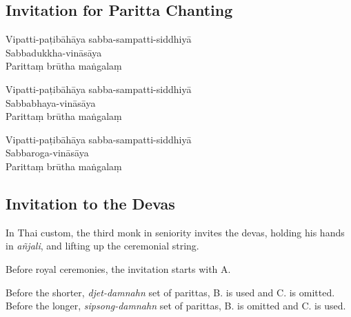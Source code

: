 \subsection{Invitation for Paritta Chanting}
\label{paritta-invitation-for-chanting}


\vspace*{5pt}

\begin{paritta}


Vipatti-paṭibāhāya sabba-sampatti-siddhiyā\\
Sabbadukkha-vināsāya\\
Parittaṃ brūtha maṅgalaṃ

Vipatti-paṭibāhāya sabba-sampatti-siddhiyā\\
Sabbabhaya-vināsāya\\
Parittaṃ brūtha maṅgalaṃ

Vipatti-paṭibāhāya sabba-sampatti-siddhiyā\\
Sabbaroga-vināsāya\\
Parittaṃ brūtha maṅgalaṃ

\end{paritta}


\subsection{Invitation to the Devas}
\label{paritta-devas}


\enlargethispage{\baselineskip}

In Thai custom, the third monk in seniority invites the devas, holding his
hands in \emph{añjali}, and lifting up the ceremonial string.

Before royal ceremonies, the invitation starts with A.

Before the shorter, \emph{djet-damnahn} set of parittas, B. is used and C. is
omitted. Before the longer, \emph{sipsong-damnahn} set of parittas, B. is
omitted and C. is used.

